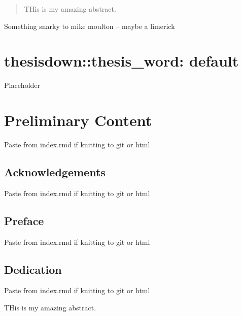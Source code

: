 \documentclass[12pt,twoside]{reedthesis}
\begin{document}
  \listoftables

  \listoffigures
  \begin{abstract}
    THis is my amazing abstract.
  \end{abstract}
  \begin{dedication}
    Something snarky to mike moulton -- maybe a limerick
  \end{dedication}
\mainmatter %
\pagestyle{fancyplain} %

\hypertarget{thesisdownthesis_word-default}{%
\chapter{thesisdown::thesis\_word: default}\label{thesisdownthesis_word-default}}

Placeholder

\hypertarget{preliminary-content}{%
\chapter*{Preliminary Content}\label{preliminary-content}}

Paste from index.rmd if knitting to git or html

\hypertarget{acknowledgements}{%
\section*{Acknowledgements}\label{acknowledgements}}

Paste from index.rmd if knitting to git or html

\hypertarget{preface}{%
\section*{Preface}\label{preface}}

Paste from index.rmd if knitting to git or html

\hypertarget{dedication}{%
\section*{Dedication}\label{dedication}}

Paste from index.rmd if knitting to git or html

THis is my amazing abstract.
\end{document}

